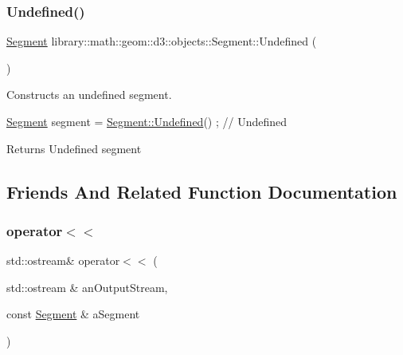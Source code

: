 \subsubsection{\texorpdfstring{Undefined()}{Undefined()}}
{\footnotesize\ttfamily \hyperlink{classlibrary_1_1math_1_1geom_1_1d3_1_1objects_1_1_segment}{Segment} library\+::math\+::geom\+::d3\+::objects\+::\+Segment\+::\+Undefined (\begin{DoxyParamCaption}{ }\end{DoxyParamCaption})\hspace{0.3cm}{\ttfamily [static]}}



Constructs an undefined segment. 


\begin{DoxyCode}
\hyperlink{classlibrary_1_1math_1_1geom_1_1d3_1_1objects_1_1_segment_a5562342d1edf2f52e37ce1bc138ee7d7}{Segment} segment = \hyperlink{classlibrary_1_1math_1_1geom_1_1d3_1_1objects_1_1_segment_a3b2505e9553ba0067f8184120c106602}{Segment::Undefined}() ; \textcolor{comment}{// Undefined}
\end{DoxyCode}


\begin{DoxyReturn}{Returns}
Undefined segment 
\end{DoxyReturn}


\subsection{Friends And Related Function Documentation}
\mbox{\label{classlibrary_1_1math_1_1geom_1_1d3_1_1objects_1_1_segment_a769c800b35f5bfd6979e7372e402ef1b}} 
\subsubsection{\texorpdfstring{operator$<$$<$}{operator<<}}
{\footnotesize\ttfamily std\+::ostream\& operator$<$$<$ (\begin{DoxyParamCaption}\item[{std\+::ostream \&}]{an\+Output\+Stream,  }\item[{const \hyperlink{classlibrary_1_1math_1_1geom_1_1d3_1_1objects_1_1_segment}{Segment} \&}]{a\+Segment }\end{DoxyParamCaption})\hspace{0.3cm}{\ttfamily [friend]}}



